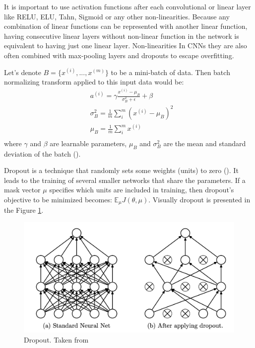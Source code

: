 It is important to use activation functions after each convolutional or linear layer like RELU, ELU, Tahn, Sigmoid or any other non-linearities. Because any combination of linear functions can be represented with another linear function, having consecutive linear layers without non-linear function in the network is equivalent to having just one linear layer. Non-linearities  In CNNs they are also often combined with max-pooling layers and dropouts to escape overfitting. 

\begin{definition}
	Let's denote $B = \{x^{(i)}, ..., x^{(m)}\}$ to be a mini-batch of data. Then batch normalizing transform applied to this input data would be:
	\begin{equation}
		\begin{split}
		& a^{(i)} = \gamma \frac{x^{(i)} - \mu_B}{\sigma^2_B + \epsilon} + \beta \\
		& \sigma^2_B = \frac{1}{m} \sum_i^m (x^{(i)} - \mu_B)^2 \\
		& \mu_B = \frac{1}{m} \sum_i^m x^{(i)} \\
		\end{split}
	\end{equation}
	where $\gamma$ and $\beta$ are learnable parameters, $\mu_B$ and $\sigma^2_B$ are the mean and standard deviation of the batch (\cite{Ioffe_2015}).
\end{definition}

\begin{definition}
	Dropout is a technique that randomly sets some weights (units) to zero (\cite{Srivastava_2014}). It leads to the training of several smaller networks that share the parameters. If a mask vector $\mu$ specifies which units are included in training, then dropout's objective to be minimized becomes: $\mathbb{E}_\mu J(\theta, \mu)$. Visually dropout is presented in the Figure \ref{fig:dropout}.
\end{definition}

\begin{figure}[H]
	\begin{center}
		\includegraphics[width=0.5\linewidth]{bilder/dropout.png}
		\caption[Dropout]%
		{Dropout. Taken from \cite{Srivastava_2014}}
		\label{fig:dropout}
	\end{center}
\end{figure}

